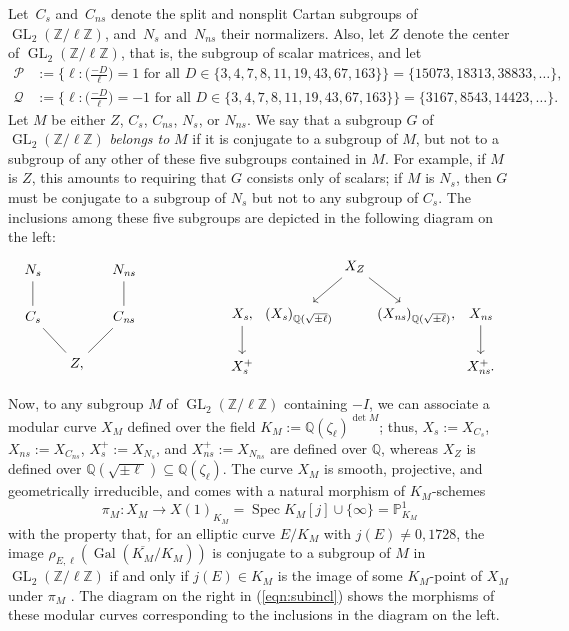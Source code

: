 \documentclass[table,dvipsnames]{amsart}
\newcommand{\Q}{\mathbb{Q}}
\newcommand{\Gal}{\operatorname{Gal}}
\newcommand{\GL}{\operatorname{GL}}
\newcommand{\Z}{\mathbb{Z}}
\newcommand{\tLegendre}[2]{\big(\tfrac{#1}{#2}\big)}
\numberwithin{equation}{section}
\newcommand{\s}{\textit{s}}
\newcommand{\ns}{\textit{ns}}
\newcommand{\Cs}{C_\s}
\newcommand{\Cns}{C_\ns}
\newcommand{\Ns}{N_\s}
\newcommand{\Nns}{N_\ns}
\begin{document}
Let~$\Cs$ and~$\Cns$ denote the split and nonsplit Cartan subgroups of~$\GL_2(\Z/\ell\Z)$, and~$\Ns$ and~$\Nns$ their normalizers. Also, let $Z$ denote the center of $\GL_2(\Z/\ell\Z)$, that is, the subgroup of scalar matrices, and let
\begin{equation}
\label{eqn:pq}
\begin{split}
\mathcal{P}&:=\{\ell:\tLegendre{-D}{\ell}=1\text{ for all }D\in\{3,4,7,8,11,19,43,67,163\}\}=\{15073,18313,38833,\ldots\},\\
\mathcal{Q}&:=\{\ell:\tLegendre{-D}{\ell}=-1\text{ for all }D\in\{3,4,7,8,11,19,43,67,163\}\}=\{3167,8543,14423,\ldots\}.
\end{split}
\end{equation}
Let $M$ be either $Z$, $\Cs$, $\Cns$, $\Ns$, or $\Nns$. We say that a subgroup $G$ of $\GL_2(\Z/\ell\Z)$ \emph{belongs to} $M$ if it is conjugate to a subgroup of $M$, but not to a subgroup of any other of these five subgroups contained in $M$. For example, if $M$ is $Z$, this amounts to requiring that $G$ consists only of scalars; if $M$ is $\Ns$, then $G$ must be conjugate to a subgroup of $\Ns$ but not to any subgroup of $\Cs$. The inclusions among these five subgroups are depicted in the following diagram on the left:
\begin{equation}
\label{eqn:subincl}
\begin{tikzcd}[column sep=small]
\Ns\arrow[d,dash]&&\Nns\arrow[d,dash]\\
\Cs\arrow[dr,dash]&&\Cns\arrow[dl,dash]\\
&Z,&
\end{tikzcd}
\qquad\qquad\qquad
\begin{tikzcd}[column sep=0pt]
&&X_Z\arrow{dl}\arrow{dr}&&\\
X_\s,\arrow{d}&(X_\s)_{\Q(\sqrt{\pm\ell})}&&(X_\ns)_{\Q(\sqrt{\pm\ell})},&X_\ns\arrow{d}\\
X_\s^+&&&&X_\ns^+.
\end{tikzcd}
\end{equation}

Now, to any subgroup $M$ of $\GL_2(\Z/\ell\Z)$ containing $-I$, we can associate a modular curve $X_M$ defined over the field $K_M:=\Q(\zeta_\ell)^{\det M}$; thus, $X_\s:=X_{\Cs}$, $X_\ns:=X_{\Cns}$, $X_\s^+:=X_{\Ns}$, and $X_\ns^+:=X_{\Nns}$ are defined over $\Q$, whereas $X_Z$ is defined over $\Q(\sqrt{\pm\ell})\subseteq\Q(\zeta_\ell)$. The curve $X_M$ is smooth, projective, and geometrically irreducible, and comes with a natural morphism of $K_M$-schemes
\begin{equation*}
\pi_M\colon X_M\longrightarrow X(1)_{K_M}=\operatorname{Spec}K_M[j]\cup\{\infty\}=\mathbb{P}^1_{K_M}
\end{equation*}
with the property that, for an elliptic curve $E/K_M$ with $j(E)\ne 0,1728$, the image $\rho_{E,\ell}(\Gal(\overline{K_M}/K_M))$ is conjugate to a subgroup of $M$ in $\GL_2(\Z/\ell\Z)$ if and only if $j(E)\in K_M$ is the image of some $K_M$-point of $X_M$ under $\pi_M$ \cite{zywina2015}. The diagram on the right in (\ref{eqn:subincl}) shows the morphisms of these modular curves corresponding to the inclusions in the diagram on the left.
\end{document}
